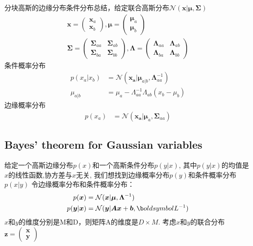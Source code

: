 \documentclass[a4paper]{article}
\begin{document}
分块高斯的边缘分布条件分布总结，给定联合高斯分布$\mathcal{N}(\mathbf{x}|\boldsymbol{\mu},\boldsymbol{\Sigma})$
\begin{align*}
  \boldsymbol{x} =
    \begin{pmatrix} \boldsymbol{x}_a\\ \boldsymbol{x}_b \end{pmatrix},
  \boldsymbol{\mu} =
    \begin{pmatrix} \boldsymbol{\mu}_a\\ \boldsymbol{\mu}_b \end{pmatrix}\\
  \boldsymbol{\Sigma} =
    \begin{pmatrix}
      \boldsymbol{\Sigma}_{aa} & \boldsymbol{\Sigma}_{ab}\\
      \boldsymbol{\Sigma}_{ba} & \boldsymbol{\Sigma}_{bb}
    \end{pmatrix},
  \boldsymbol{\Lambda} =
    \begin{pmatrix}
      \boldsymbol{\Lambda}_{aa} & \boldsymbol{\Lambda}_{ab}\\
      \boldsymbol{\Lambda}_{ba} & \boldsymbol{\Lambda}_{bb}
    \end{pmatrix}
\end{align*}
条件概率分布
\begin{align*}
  p(x_a|x_b) &= \mathcal{N}(\mathbf{x_a}|\boldsymbol{\mu}_{a|b},\boldsymbol{\Lambda}_{aa}^{-1})\\
  \mu_{a|b}  &=  \mu_a - \Lambda_{aa}^{-1}\Lambda_{ab}(x_b - \mu_b)
\end{align*}
边缘概率分布
\begin{align*}
  p(x_a) &= \mathcal{N}(\mathbf{x_a}|\boldsymbol{\mu}_a,\boldsymbol{\Sigma}_{aa})
\end{align*}

\subsection{Bayes’ theorem for Gaussian variables}
\label{sec:2.3.3}

给定一个高斯边缘分布$p(x)$和一个高斯条件分布$p(y | x)$, 其中$p(y | x)$的均值是$x$的线性函数,协方差与$x$无关, 我们想找到边缘概率分布$p(y)$和条件概率分布$p(x|y)$
令边缘概率分布和条件概率分布：
\begin{align}
  p(\boldsymbol{x}) &= \mathcal{N}(\boldsymbol{x}|\boldsymbol{\mu},\boldsymbol{\Lambda}^{-1})\\
  p(\boldsymbol{y}|\boldsymbol{x}) &= \mathcal{N}(\boldsymbol{y}|\boldsymbol{Ax}+\boldsymbol{b},\b
oldsymbol{L}^{-1})
\end{align}
$x$和$y$的维度分别是M和D，则矩阵A的维度是$D \times M$.
考虑$x$和$y$的联合分布
$\boldsymbol{z} = \begin{pmatrix} \boldsymbol{x}\\ \boldsymbol{y} \end{pmatrix}$
\end{document}

